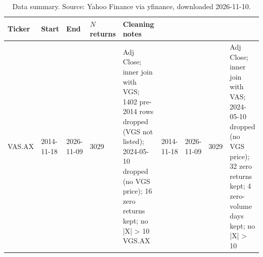 \begin{table}
\caption{Data summary. Source: Yahoo Finance via yfinance, downloaded 2026-11-10.}
\label{tab:data}
\begin{tabular}{llllp{7cm}}
\toprule
Ticker & Start & End & $N$ returns & Cleaning notes \\
\midrule
VAS.AX & 2014-11-18 & 2026-11-09 & 3029 & Adj Close; inner join with VGS; 1402 pre-2014 rows dropped (VGS not listed); 2024-05-10 dropped (no VGS price); 16 zero returns kept; no |X| > 10%
VGS.AX & 2014-11-18 & 2026-11-09 & 3029 & Adj Close; inner join with VAS; 2024-05-10 dropped (no VGS price); 32 zero returns kept; 4 zero-volume days kept; no |X| > 10%
\bottomrule
\end{tabular}
\end{table}
